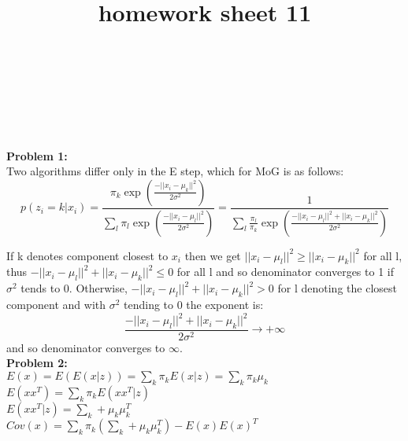 \documentclass{article}
\title{homework sheet 11}
\author{
	\name{Denys Sobchyshak}\\
	\imat{03636581}\\
	\email{denys.sobchyshak@tum.de}
	\And
	\name{Sergey Zakharov} \\
	\imat{03636642}\\
	\email{ga39pad@mytum.de}
}
\begin{document}
\maketitle
\textbf{Problem 1:} \\
Two algorithms differ only in the E step, which for MoG is as follows:
$$
p(z_i=k|x_i) = \frac{\pi_k \exp (\frac{-||x_i-\mu_k||^2}{2\sigma^2})}{\sum_{l}\pi_l\exp(\frac{-||x_i-\mu_l||^2}{2\sigma^2})} = \frac{1}{ \sum_{l} \frac{\pi_l}{\pi_k} \exp(\frac{-||x_i-\mu_l||^2 +||x_i-\mu_k||^2 }{2\sigma^2})}
$$

If k denotes component closest to $x_i$ then we get $||x_i-\mu_l||^2 \ge ||x_i-\mu_k||^2$ for all l, thus $-||x_i-\mu_l||^2 + ||x_i-\mu_k||^2 \le 0$ for all l and so denominator converges to 1 if $\sigma^2$ tends to 0. Otherwise, $-||x_i-\mu_l||^2 + ||x_i-\mu_k||^2 > 0$ for l denoting the closest component and with $\sigma^2$ tending to 0 the exponent is:
$$
\frac{-||x_i-\mu_l||^2 + ||x_i-\mu_k||^2}{2\sigma^2} \to +\infty
$$
and so denominator converges to $\infty$.
\\

\textbf{Problem 2:} \\
$E(x)=E(E(x|z))=\sum_{k} \pi_k E(x|z)= \sum_{k} \pi_k\mu_k$\\
$E(xx^T) = \sum_{k} \pi_k E(xx^T|z)$\\
$E(xx^T|z) = \sum_k + \mu_k\mu_k^T$\\
$Cov(x)=\sum_{k} \pi_k(\sum_{k}+\mu_k\mu_k^T)-E(x)E(x)^T$
\end{document}
